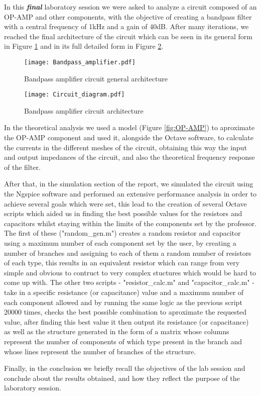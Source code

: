 \hspace{12pt} In this \textbf{\textit{final}} laboratory session we were asked to analyze a circuit composed of an OP-AMP and other components, with the objective of creating a bandpass filter with a central frequency of 1kHz	 and a gain of 40dB. After many iterations, we reached the final architecture of the circuit which can be seen in its general form in Figure \ref{fig:bandpass_amp} and in its full detailed form in Figure \ref{fig:circuit}.

\vspace{-10pt}
\begin{figure}[h]
 	\centering
	\texttt{[image: Bandpass\_amplifier.pdf]}
	\vspace{-20pt}
	\caption{Bandpass amplifier circuit general architecture}
	\label{fig:bandpass_amp}
\end{figure}

\vspace{-25pt}
\begin{figure}[h]
 	\centering
	\texttt{[image: Circuit\_diagram.pdf]}
	\vspace{-30pt}
	\caption{Bandpass amplifier circuit architecture}
	\label{fig:circuit}
\end{figure}

In the theoretical analysis we used a model (Figure \ref{fig:OP-AMP}) to aproximate the OP-AMP component and used it, alongside the Octave software, to calculate the currents in the different meshes of the circuit, obtaining this way the input and output impedances of the circuit, and also the theoretical frequency response of the filter.
\vspace{10pt}

After that, in the simulation section of the report, we simulated the circuit using the Ngspice software and performed an extensive performance analysis in order to achieve several goals which were set, this lead to the creation of several Octave scripts which aided us in finding the best possible values for the resistors and capacitors whilst staying within the limits of the components set by the professor. The first of these ("random\_gen.m") creates a random resistor and capacitor using a maximum number of each component set by the user, by creating a number of branches and assigning to each of them a random number of resistors of each type, this results in an equivalent resistor which can range from very simple and obvious to contruct to very complex stuctures which would be hard to come up with. The other two scripts - "resistor\_calc.m" and "capacitor\_calc.m" - take in a specific resistance (or capacitance) value and a maximum number of each component allowed and by running the same logic as the previous script 20000 times, checks the best possible combination to aproximate the requested value, after finding this best value it then output its resistance (or capacitance) as well as the structure generated in the form of a matrix whose columns represent the number of components of which type present in the branch and whose lines represent the number of branches of the structure.
\vspace{10pt}

Finally, in the conclusion we briefly recall the objectives of the lab session and conclude about the results obtained, and how they reflect the purpose of the laboratory session.

\pagebreak
